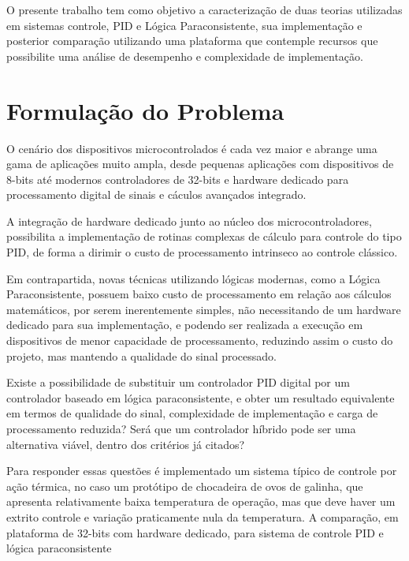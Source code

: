 \documentclass[12pt,a4paper]{report}
\begin{document}
O presente trabalho tem como objetivo a caracterização de duas teorias utilizadas em sistemas controle, PID e Lógica Paraconsistente, sua implementação e posterior comparação utilizando uma plataforma que contemple recursos que possibilite uma análise de desempenho e complexidade de implementação.


\section{Formulação do Problema}
O cenário dos dispositivos microcontrolados é cada vez maior e abrange uma gama de aplicações muito ampla, desde pequenas aplicações com dispositivos de 8-bits até modernos controladores de 32-bits e hardware dedicado para processamento digital de sinais e cáculos avançados integrado.

A integração de hardware dedicado junto ao núcleo dos microcontroladores, possibilita a implementação de rotinas complexas de cálculo para controle do tipo PID, de forma a dirimir o custo de processamento intrinseco ao controle clássico. 

Em contrapartida, novas técnicas utilizando lógicas modernas, como a Lógica Paraconsistente, possuem baixo custo de processamento em relação aos cálculos matemáticos, por serem inerentemente simples, não necessitando de um hardware dedicado para sua implementação, e podendo ser realizada a execução em dispositivos de menor capacidade de processamento, reduzindo assim o custo do projeto, mas mantendo a qualidade do sinal processado.

Existe a possibilidade de substituir um controlador PID digital por um controlador baseado em lógica paraconsistente, e obter um resultado equivalente em termos de qualidade do sinal, complexidade de implementação e carga de processamento reduzida? Será que um controlador híbrido pode ser uma alternativa viável, dentro dos critérios já citados? 

Para responder essas questões é implementado um sistema típico de controle por ação térmica, no caso um protótipo de chocadeira de ovos de galinha, que apresenta relativamente baixa temperatura de operação, mas que deve haver um extrito controle e variação praticamente nula da temperatura.
 A comparação, em plataforma de 32-bits com hardware dedicado, para sistema de controle PID e lógica paraconsistente 
\end{document}
